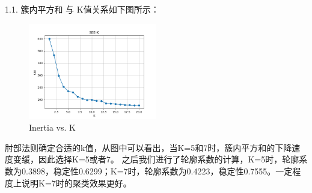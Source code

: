 \documentclass[8pt]{article}
\begin{document}
1.1. 簇内平方和 与 K值关系如下图所示：
\begin{figure}[H]
    \centering
    \includegraphics[width=0.5\textwidth]{./Prob4/out/task1_rand14/SEE-K.png}
    \caption{Inertia vs. K}
    \label{fig: Inertia vs. K rand14}
\end{figure}
肘部法则确定合适的k值，从图中可以看出，当K=5和7时，簇内平方和的下降速度变缓，因此选择K=5或者7。
之后我们进行了轮廓系数的计算，K=5时，轮廓系数为0.3898，稳定性0.6299；K=7时，轮廓系数为0.4223，稳定性0.7555。一定程度上说明K=7时的聚类效果更好。
\end{document}
